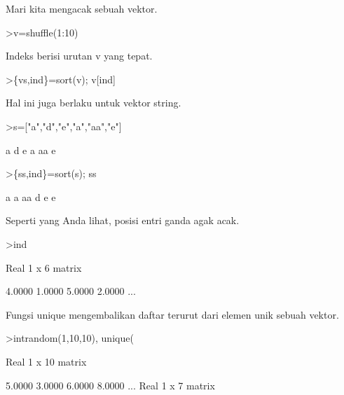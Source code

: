 \documentclass{article}
\begin{document}
\begin{eulernotebook}
\begin{eulercomment}
Mari kita mengacak sebuah vektor.
\end{eulercomment}
\begin{eulerprompt}
>v=shuffle(1:10)
\end{eulerprompt}
\begin{euleroutput}
  [4,  5,  10,  6,  8,  9,  1,  7,  2,  3]
\end{euleroutput}
\begin{eulercomment}
Indeks berisi urutan v yang tepat.
\end{eulercomment}
\begin{eulerprompt}
>\{vs,ind\}=sort(v); v[ind]
\end{eulerprompt}
\begin{euleroutput}
  [1,  2,  3,  4,  5,  6,  7,  8,  9,  10]
\end{euleroutput}
\begin{eulercomment}
Hal ini juga berlaku untuk vektor string.
\end{eulercomment}
\begin{eulerprompt}
>s=["a","d","e","a","aa","e"]
\end{eulerprompt}
\begin{euleroutput}
  a
  d
  e
  a
  aa
  e
\end{euleroutput}
\begin{eulerprompt}
>\{ss,ind\}=sort(s); ss
\end{eulerprompt}
\begin{euleroutput}
  a
  a
  aa
  d
  e
  e
\end{euleroutput}
\begin{eulercomment}
Seperti yang Anda lihat, posisi entri ganda agak acak.
\end{eulercomment}
\begin{eulerprompt}
>ind
\end{eulerprompt}
\begin{euleroutput}
  Real 1 x 6 matrix
  
       4.0000      1.0000      5.0000      2.0000     ...
\end{euleroutput}
\begin{eulercomment}
Fungsi unique mengembalikan daftar terurut dari elemen unik sebuah
vektor.
\end{eulercomment}
\begin{eulerprompt}
>intrandom(1,10,10), unique(%
\end{eulerprompt}
\begin{euleroutput}
  Real 1 x 10 matrix
  
       5.0000      3.0000      6.0000      8.0000     ...
  Real 1 x 7 matrix
  

\end{euleroutput}
\end{eulernotebook}
\end{document}

